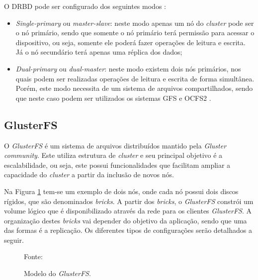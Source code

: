 O \ac{DRBD} pode ser configurado dos seguintes modos \cite{drbd}:
\begin{itemize}
 \item \textit{Single-primary} ou \textit{master-slave}: neste modo apenas um nó do \textit{cluster} pode ser o nó primário, sendo que somente
 o nó primário terá permissão para acessar o dispositivo, ou seja, somente ele poderá fazer operações de leitura e escrita. Já o nó 
 secundário terá apenas uma réplica dos dados;
 \item \textit{Dual-primary} ou \textit{dual-master}: neste modo existem dois nós primários, nos quais podem ser realizadas operações de leitura e 
 escrita de forma simultânea. Porém, este modo necessita de um sistema de arquivos compartilhados, sendo que neste caso podem ser utilizados os
 sistemas \ac{GFS} \cite{gfs} e \ac{OCFS2} \cite{ocfs2}.
\end{itemize}

\subsection{GlusterFS}
\label{section:glusterfs}
O \textit{GlusterFS} \cite{glusterfs} é um sistema de arquivos distribuídos mantido pela \textit{Gluster community}. Este utiliza estrutura 
de \textit{cluster} e seu principal objetivo é a escalabilidade, ou seja, este possui funcionalidades que facilitam ampliar a capacidade 
do \textit{cluster} a partir da inclusão de novos nós.

Na Figura \ref{fig:glusterfs} tem-se um exemplo de dois nós, onde cada nó possui dois discos rígidos, que são denominados \textit{bricks}. 
A partir dos \textit{bricks}, o \textit{GlusterFS} constrói um volume lógico que é disponibilizado através da rede para os clientes 
\textit{GlusterFS}. A organização destes \textit{bricks} vai depender do objetivo da aplicação, sendo que uma das formas é a replicação. 
Os diferentes tipos de configurações serão detalhados a seguir.

\begin{figure}[h!]
 \centering
 \caption{Modelo do \textit{GlusterFS}.}
 Fonte: \citet{davies2013}
 \label{fig:glusterfs}
\end{figure}

